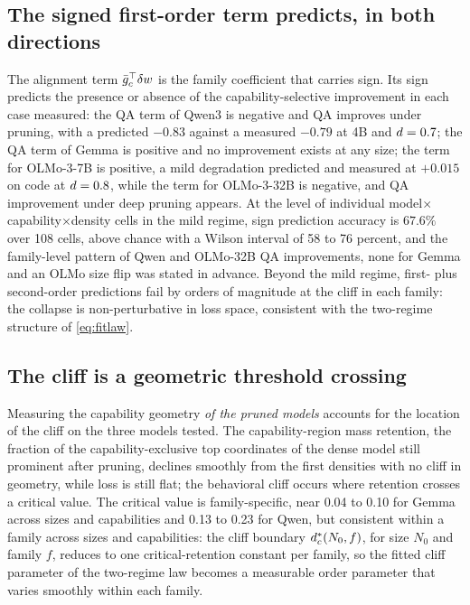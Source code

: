 \subsection{The signed first-order term predicts, in both directions}
\label{sec:mech}

The alignment term $\bar{g}_{c}^{\top}\delta w$ is the family
coefficient that carries sign. Its sign predicts the presence or absence of the
capability-selective improvement in each case measured:
the QA term of Qwen3 is negative and QA improves under pruning, with a predicted $-0.83$ against a measured $-0.79$ at 4B and $d=0.7$; the QA term of Gemma is
positive and no improvement exists at any size; the term for OLMo-3-7B is positive, a mild degradation predicted and measured at $+0.015$ on code at $d=0.8$, while the term for OLMo-3-32B is negative, and
QA improvement under deep pruning appears. At the level of individual model$\times$capability$\times$density
cells in the mild regime, sign prediction accuracy is $67.6\%$ over 108 cells, above chance with a Wilson interval of 58 to 76 percent, and the family-level pattern of Qwen and OLMo-32B QA improvements, none for Gemma and an OLMo size flip was stated in advance. Beyond the mild regime, first- plus second-order
predictions fail by orders of magnitude at the cliff in each family:
the collapse is non-perturbative in loss space, consistent with the
two-regime structure of \eqref{eq:fitlaw}.

\subsection{The cliff is a geometric threshold crossing}
\label{sec:orderparam}

Measuring the capability geometry \emph{of the pruned models}
accounts for the location of the cliff on the three models tested. The capability-region mass retention, the fraction of the capability-exclusive top coordinates of the dense model still prominent after pruning, declines smoothly from the first densities with no cliff in geometry, while loss is still flat;
the behavioral cliff occurs where retention crosses a critical value.
The critical value is family-specific, near 0.04 to 0.10 for Gemma across sizes and capabilities and 0.13 to 0.23 for Qwen, but consistent
within a family across sizes and capabilities: the cliff boundary
$d_c^{*}(N_0,f)$, for size $N_0$ and family $f$, reduces to one critical-retention constant per
family, so the fitted cliff parameter of the two-regime
law becomes a measurable order parameter that varies smoothly within each family.

